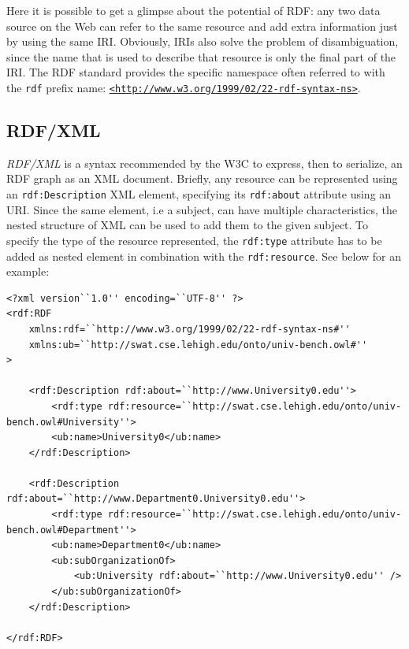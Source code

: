 \documentclass[10pt, a4paper]{report}
\begin{document}
Here it is possible to get a glimpse about the potential of RDF: any two data source on the Web can refer to the same resource and add extra information just by using the same IRI.
Obviously, IRIs also solve the problem of disambiguation, since the name that is used to describe that resource is only the final part of the IRI. The RDF standard provides the specific namespace often referred to with the \texttt{rdf} prefix name: \href{http://www.w3.org/1999/02/22-rdf-syntax-ns}{\texttt{<http://www.w3.org/1999/02/22-rdf-syntax-ns>}}.

\subsection{RDF/XML}

\textit{RDF/XML} is a syntax recommended by the W3C to express, then to serialize, an RDF graph as an XML document\cite{rdf_xml_w3c}. Briefly, any resource can be represented using an \texttt{rdf:Description} XML element, specifying its \texttt{rdf:about} attribute using an URI. Since the same element, i.e a subject, can have multiple characteristics, the nested structure of XML can be used to add them to the given subject. To specify the type of the resource represented, the \texttt{rdf:type} attribute has to be added as nested element in combination with the \texttt{rdf:resource}. See below for an example: \\

\begin{minipage}{0.92\textwidth}
	\lstset{language=xml}
	\begin{lstlisting}
<?xml version``1.0'' encoding=``UTF-8'' ?>
<rdf:RDF
    xmlns:rdf=``http://www.w3.org/1999/02/22-rdf-syntax-ns#''
    xmlns:ub=``http://swat.cse.lehigh.edu/onto/univ-bench.owl#''
> 

    <rdf:Description rdf:about=``http://www.University0.edu''>
        <rdf:type rdf:resource=``http://swat.cse.lehigh.edu/onto/univ-bench.owl#University''>
        <ub:name>University0</ub:name>
    </rdf:Description>
    
    <rdf:Description rdf:about=``http://www.Department0.University0.edu''>
        <rdf:type rdf:resource=``http://swat.cse.lehigh.edu/onto/univ-bench.owl#Department''>
        <ub:name>Department0</ub:name>
        <ub:subOrganizationOf>
            <ub:University rdf:about=``http://www.University0.edu'' />
        </ub:subOrganizationOf>
    </rdf:Description>
    
</rdf:RDF>
                \end{lstlisting}
\end{minipage} \\
\\
\end{document}
